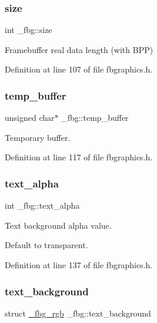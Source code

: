 \subsubsection{\texorpdfstring{size}{size}}
{\footnotesize\ttfamily int \+\_\+fbg\+::size}



Framebuffer real data length (with B\+PP) 



Definition at line 107 of file fbgraphics.\+h.

\mbox{\label{struct__fbg_a0463af9bf583afe770b822c1fbb9a24d}} 
\subsubsection{\texorpdfstring{temp\+\_\+buffer}{temp\_buffer}}
{\footnotesize\ttfamily unsigned char$\ast$ \+\_\+fbg\+::temp\+\_\+buffer}



Temporary buffer. 



Definition at line 117 of file fbgraphics.\+h.

\mbox{\label{struct__fbg_a870987786121c51135f20b630d731abd}} 
\subsubsection{\texorpdfstring{text\+\_\+alpha}{text\_alpha}}
{\footnotesize\ttfamily int \+\_\+fbg\+::text\+\_\+alpha}



Text background alpha value. 

Default to transparent. 

Definition at line 137 of file fbgraphics.\+h.

\mbox{\label{struct__fbg_afd34a8de5a853e915bd101f11d44cf67}} 
\subsubsection{\texorpdfstring{text\+\_\+background}{text\_background}}
{\footnotesize\ttfamily struct \mbox{\hyperlink{fbgraphics_8h_struct__fbg__rgb}{\+\_\+fbg\+\_\+rgb}} \+\_\+fbg\+::text\+\_\+background}



